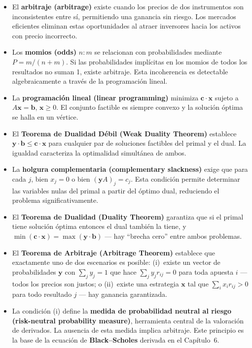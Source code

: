 \documentclass[12pt]{article}
\begin{document}
\begin{itemize}
  \item El \textbf{arbitraje (arbitrage)} existe cuando los precios de dos
        instrumentos son inconsistentes entre s\'i, permitiendo una ganancia
        sin riesgo. Los mercados eficientes eliminan estas oportunidades al
        atraer inversores hacia los activos con precio incorrecto.

  \item Los \textbf{momios (odds)} $n:m$ se relacionan con probabilidades
        mediante $P = m/(n+m)$. Si las probabilidades impl\'icitas en los
        momios de todos los resultados no suman 1, existe arbitraje. Esta
        incoherencia es detectable algebraicamente a trav\'es de la
        programaci\'on lineal.

  \item La \textbf{programaci\'on lineal (linear programming)} minimiza
        $\mathbf{c} \cdot \mathbf{x}$ sujeto a $A\mathbf{x} = \mathbf{b}$,
        $\mathbf{x} \geq 0$. El conjunto factible es siempre convexo y la
        soluci\'on \'optima se halla en un v\'ertice.

  \item El \textbf{Teorema de Dualidad D\'ebil (Weak Duality Theorem)}
        establece $\mathbf{y} \cdot \mathbf{b} \leq \mathbf{c} \cdot \mathbf{x}$
        para cualquier par de soluciones factibles del primal y el dual.
        La igualdad caracteriza la optimalidad simult\'anea de ambos.

  \item La \textbf{holgura complementaria (complementary slackness)} exige
        que para cada $j$, bien $x_j = 0$ o bien $(\mathbf{y}A)_j = c_j$.
        Esta condici\'on permite determinar las variables nulas del primal
        a partir del \'optimo dual, reduciendo el problema significativamente.

  \item El \textbf{Teorema de Dualidad (Duality Theorem)} garantiza que si
        el primal tiene soluci\'on \'optima entonces el dual tambi\'en la
        tiene, y $\min(\mathbf{c} \cdot \mathbf{x}) = \max(\mathbf{y} \cdot \mathbf{b})$
        --- hay ``brecha cero'' entre ambos problemas.

  \item El \textbf{Teorema de Arbitraje (Arbitrage Theorem)} establece que
        exactamente uno de dos escenarios es posible: (i)~existe un vector de
        probabilidades $\mathbf{y}$ con $\sum_j y_j = 1$ que hace $\sum_j y_j r_{ij} = 0$
        para toda apuesta $i$ --- todos los precios son justos; o (ii)~existe
        una estrategia $\mathbf{x}$ tal que $\sum_i x_i r_{ij} > 0$ para todo
        resultado $j$ --- hay ganancia garantizada.

  \item La condici\'on (i) define la \textbf{medida de probabilidad neutral
        al riesgo (risk-neutral probability measure)}, herramienta central
        de la valoraci\'on de derivados. La ausencia de esta medida implica
        arbitraje. Este principio es la base de la ecuaci\'on de
        \textbf{Black--Scholes} derivada en el Cap\'itulo~6.
\end{itemize}
\end{document}
